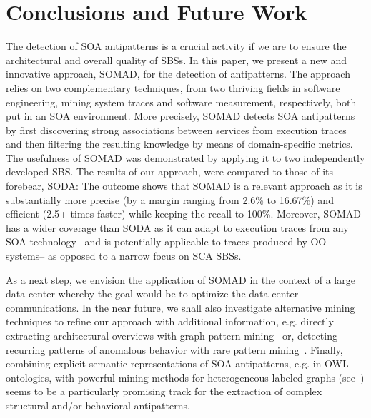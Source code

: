 \vspace{0.3cm}
\section{Conclusions and Future Work \label{sec:Conclusions}}
\vspace{0.2cm}
The detection of SOA antipatterns is a crucial activity if we are to ensure
the architectural and overall quality of SBSs. In this paper, we present a new and innovative
approach, SOMAD, for the detection of antipatterns. The approach relies on two complementary
techniques, from two thriving fields in software engineering, mining system traces and software measurement, respectively, both put in an SOA environment.
More precisely, SOMAD detects SOA antipatterns by first discovering strong associations between
services from execution traces and then filtering the resulting knowledge by means of
domain-specific metrics. The usefulness of SOMAD was demonstrated
by applying it to two independently developed SBS. The results of our approach, were compared to
those of its forebear, SODA: The outcome shows that SOMAD is a relevant approach as it is substantially
more precise (by a margin ranging from 2.6\% to 16.67\%) and efficient (2.5+ times faster) while keeping the recall to 100\%. Moreover, SOMAD has a wider coverage than SODA as it can adapt to execution traces from any SOA technology --and is potentially applicable to traces produced by OO systems-- as opposed to a narrow focus on SCA SBSs. 

As a next step, we envision the application of SOMAD in the context of a large data center 
whereby the goal would be to optimize the data center communications. 
In the near future, we shall also investigate alternative mining techniques
to refine our approach with additional information, e.g. directly extracting architectural
overviews with graph pattern mining~\cite{chakrabarti2006graph}
or, detecting recurring patterns of anomalous behavior with rare pattern mining~\cite{fca-rare:szathmary+07}.
Finally, combining explicit semantic representations of SOA antipatterns, e.g. in OWL ontologies, with
powerful mining methods for heterogeneous labeled graphs (see~\cite{onto-pers:adda+10})
seems to be a particularly promising track
for the extraction of complex structural and/or behavioral antipatterns.
